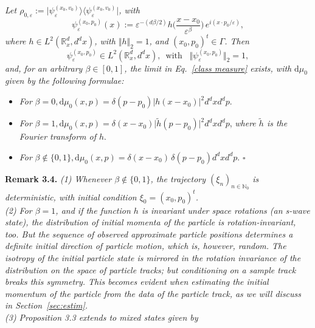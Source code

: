 \documentclass[12pt]{article}
\begin{document}
\vspace{0.2cm} \textit{Let $\rho_{0, \varepsilon}:= \big| \psi_{\varepsilon}^{(x_0, v_0)}\rangle \langle \psi_{\varepsilon}^{(x_0, v_0)}\big|$, with 
\begin{equation}\label{wave function}
\psi_{\varepsilon}^{(x_0,p_0)}(x):= \varepsilon^{-(d\beta/2)} h\Big(\frac{x-x_0}{\varepsilon^{\beta}}\Big) \,
e^{i(x\cdot p_0/\varepsilon)},
\end{equation}
where $h \in L^{2}(\mathbb{R}^{d}_{x}, d^{d}x)$, with $\Vert h \Vert_{2}=1$, and $(x_0, p_0)^{t} \in \Gamma$.
Then 
$$\psi_{\varepsilon}^{(x_0,p_0)} \in L^{2}(\mathbb{R}^{d}_{x}, d^{d}x), \,\text{ with }\,\,\, \Vert \psi_{\varepsilon}^{(x_0,p_0)} \Vert_{2}=1, $$
and, for an arbitrary $\beta \in [0,1]$, the limit in Eq.~\eqref{class measure} exists, with} $\text{d}\mu_0$ \textit{given by the following formulae:}
\begin{itemize}
\item{ \textit{For} $\beta =0, \text{d}\mu_{0}(x,p) = \delta(p-p_0) \vert h(x-x_0) \vert^{2} d^{d}x d^{d}p.$}
\item{\textit{For} $\beta=1, \text{d}\mu_{0}(x,p) = \delta(x-x_0) \vert \widetilde{h}(p-p_0) \vert^{2} d^{d}x d^{d}p$, \textit{where
$\widetilde{h}$ is the Fourier transform of $h$}.}
\item{\textit{For} $\beta \notin \{0,1\},  \text{d}\mu_{0}(x,p) = \delta(x-x_0)\,\delta(p-p_0) d^{d}x d^{d}p$. \hspace{5.8cm}$\square$}
\end{itemize}
\noindent
{\bf{Remark 3.4.}} \textit{(1) Whenever $\beta \notin\{0,1\}$, the trajectory $(\xi_n)_{n\in \mathbb{N}_0}$ is deterministic, with 
initial condition $\xi_0=(x_0, p_0)^{t}$.}\\
\textit{(2) For $\beta=1$, and if the function $h$ is invariant under space rotations (an s-wave state), the distribution of initial momenta of the particle is rotation-invariant, too. But the sequence of observed approximate 
particle positions determines a definite initial direction of particle motion, which is, however, random. 
The isotropy of the initial particle state is mirrored in the rotation invariance of the \textit{distribution} on the space 
of particle tracks; but conditioning on a sample track breaks this symmetry. This becomes evident when 
estimating the initial momentum of the particle from the data of the particle track, as we will 
discuss in Section~\ref{sec:estim}.}\\
\textit{(3) Proposition 3.3 extends to mixed states given by}
\end{document}
